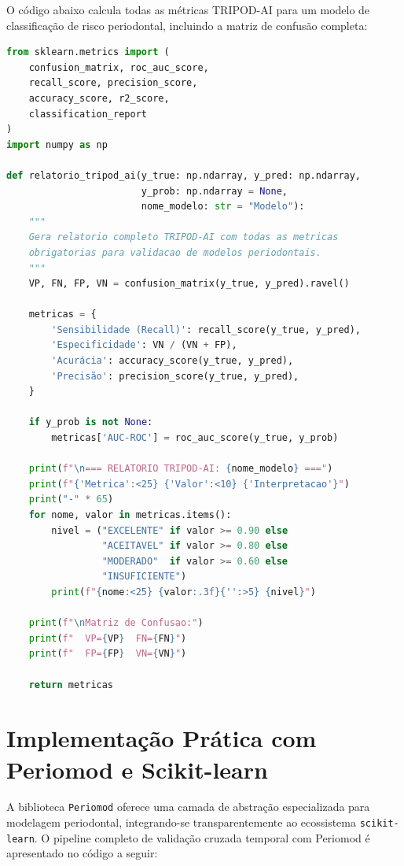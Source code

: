 O código abaixo calcula todas as métricas TRIPOD-AI para um modelo de
classificação de risco periodontal, incluindo a matriz de confusão
completa:

\begin{lstlisting}[language=Python, caption={Cálculo completo das
métricas TRIPOD-AI para classificação periodontal},
label={lst:tripod_metrics_code}]
from sklearn.metrics import (
    confusion_matrix, roc_auc_score,
    recall_score, precision_score,
    accuracy_score, r2_score,
    classification_report
)
import numpy as np

def relatorio_tripod_ai(y_true: np.ndarray, y_pred: np.ndarray,
                        y_prob: np.ndarray = None,
                        nome_modelo: str = "Modelo"):
    """
    Gera relatorio completo TRIPOD-AI com todas as metricas
    obrigatorias para validacao de modelos periodontais.
    """
    VP, FN, FP, VN = confusion_matrix(y_true, y_pred).ravel()
    
    metricas = {
        'Sensibilidade (Recall)': recall_score(y_true, y_pred),
        'Especificidade': VN / (VN + FP),
        'Acurácia': accuracy_score(y_true, y_pred),
        'Precisão': precision_score(y_true, y_pred),
    }
    
    if y_prob is not None:
        metricas['AUC-ROC'] = roc_auc_score(y_true, y_prob)
    
    print(f"\n=== RELATORIO TRIPOD-AI: {nome_modelo} ===")
    print(f"{'Metrica':<25} {'Valor':<10} {'Interpretacao'}")
    print("-" * 65)
    for nome, valor in metricas.items():
        nivel = ("EXCELENTE" if valor >= 0.90 else
                 "ACEITAVEL" if valor >= 0.80 else
                 "MODERADO"  if valor >= 0.60 else
                 "INSUFICIENTE")
        print(f"{nome:<25} {valor:.3f}{'':>5} {nivel}")
    
    print(f"\nMatriz de Confusao:")
    print(f"  VP={VP}  FN={FN}")
    print(f"  FP={FP}  VN={VN}")
    
    return metricas
\end{lstlisting}

\section{Implementação Prática com Periomod e Scikit-learn}

A biblioteca \texttt{Periomod} oferece uma camada de abstração
especializada para modelagem periodontal, integrando-se
transparentemente ao ecossistema \texttt{scikit-learn}. O pipeline
completo de validação cruzada temporal com Periomod é apresentado no
código a seguir:

